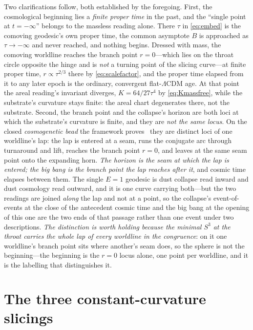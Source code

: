 \documentclass[11pt,a4paper]{article}
\theoremstyle{definition}
\begin{document}
Two clarifications follow, both established by the foregoing. First, the cosmological beginning lies a \emph{finite proper time} in the past, and the ``single point at $t=-\infty$'' belongs to the massless reading alone. There $\tau$ in \eqref{eq:embed} is the comoving geodesic's own proper time, the common asymptote $B$ is approached as $\tau\to-\infty$ and never reached, and nothing begins. Dressed with mass, the comoving worldline reaches the branch point $r=0$---which lies on the throat circle opposite the hinge and is \emph{not} a turning point of the slicing curve---at finite proper time, $r\propto\tau^{2/3}$ there by \eqref{eq:scalefactor}, and the proper time elapsed from it to any later epoch is the ordinary, convergent flat-$\Lambda$CDM age. At that point the areal reading's invariant diverges, $K=64/27\tau^{4}$ by \eqref{eq:Kmassfree}, while the substrate's curvature stays finite: the areal chart degenerates there, not the substrate. Second, the branch point and the collapse's horizon are both loci at which the substrate's curvature is finite, and they are \emph{not the same locus}. On the closed \emph{cosmogenetic bead} the framework proves~\cite{JanzenCRframework,JanzenBHcausality} they are distinct loci of one worldline's lap: the lap is entered at a seam, runs the conjugate arc through turnaround and lift, reaches the branch point $r=0$, and leaves at the same seam point onto the expanding horn. \emph{The horizon is the seam at which the lap is entered; the big bang is the branch point the lap reaches after it}, and cosmic time elapses between them. The single $E=1$ geodesic is dust collapse read inward and dust cosmology read outward, and it is one curve carrying both---but the two readings are joined \emph{along} the lap and not at a point, so the collapse's event-of-events at the close of the antecedent cosmic time and the big bang at the opening of this one are the two ends of that passage rather than one event under two descriptions. \emph{The distinction is worth holding because the minimal $S^{3}$ at the throat carries the whole lap of every worldline in the congruence}: on it one worldline's branch point sits where another's seam does, so the sphere is not the beginning---the beginning is the $r=0$ locus alone, one point per worldline, and it is the labelling that distinguishes it.

\section{The three constant-curvature slicings}\label{sec:trichotomy}
\end{document}
